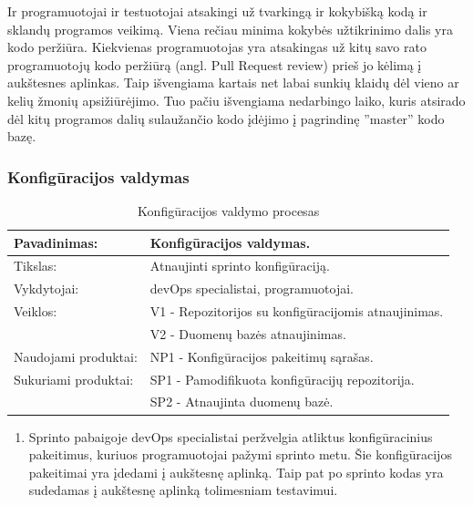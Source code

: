 \documentclass{VUMIFPSkursinis}
\begin{document}
	\par Ir programuotojai ir testuotojai atsakingi už tvarkingą ir kokybišką kodą ir sklandų programos veikimą. Viena rečiau minima kokybės užtikrinimo dalis yra kodo peržiūra. Kiekvienas programuotojas yra atsakingas už kitų savo rato programuotojų kodo peržiūrą (angl. Pull Request review) prieš jo kėlimą į aukštesnes aplinkas. Taip išvengiama kartais net labai sunkių klaidų dėl vieno ar kelių žmonių apsižiūrėjimo. Tuo pačiu išvengiama nedarbingo laiko, kuris atsirado dėl kitų programos dalių sulaužančio kodo įdėjimo į pagrindinę ''master'' kodo bazę.
	\subsubsection{Konfigūracijos valdymas}
	\begin{center}
		\begin{table}[ht]
		\caption{Konfigūracijos valdymo procesas}
		\begin{tabular}{ | l | l | } 
		\hline
		Pavadinimas:         & Konfigūracijos valdymas.                      \\ \hline
		Tikslas: 	           & Atnaujinti sprinto konfigūraciją.      \\ \hline
		Vykdytojai:          & devOps specialistai, programuotojai.                       \\ \hline
		Veiklos:             & V1 - Repozitorijos su konfigūracijomis atnaujinimas. 									  \\
						             & V2 - Duomenų bazės atnaujinimas. 							 \\ \hline
		Naudojami produktai: & NP1 - Konfigūracijos pakeitimų sąrašas.								 \\ \hline
		Sukuriami produktai: & SP1 - Pamodifikuota konfigūracijų repozitorija. 							  		\\
												 & SP2 - Atnaujinta duomenų bazė. 											 \\  \hline
		\end{tabular}
	\end{table}
		\end{center}
		\begin{enumerate}
			\item Sprinto pabaigoje devOps specialistai peržvelgia atliktus konfigūracinius pakeitimus, kuriuos programuotojai pažymi sprinto metu. Šie konfigūracijos pakeitimai yra įdedami į aukštesnę aplinką. Taip pat po sprinto kodas yra sudedamas į aukštesnę aplinką tolimesniam testavimui.
		\end{enumerate}
\end{document}

